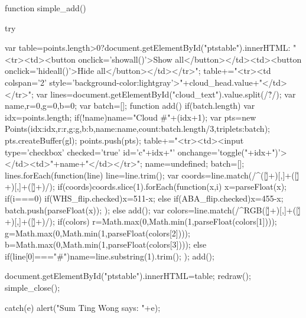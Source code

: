             function simple_add(){
                try{
                    var table=points.length>0?document.getElementById("ptstable").innerHTML:
                            "<tr><td><button onclick='showall()'>Show all</button></td><td><button onclick='hideall()'>Hide all</button></td></tr>";
                    table+="<tr><td colspan='2' style='background-color:lightgray'>"+cloud_head.value+"</td></tr>";
                    var lines=document.getElementById("cloud_text").value.split(/\r?\n/);
                    var name,r=0,g=0,b=0;
                    var batch=[];
                    function add(){
                        if(batch.length){
                            var idx=points.length;
                            if(!name)name="Cloud #"+(idx+1);
                            var pts=new Points({idx:idx,r:r,g:g,b:b,name:name,count:batch.length/3,triplets:batch});
                            pts.createBuffer(gl);
                            points.push(pts);
                            table+="<tr><td><input type='checkbox' checked='true' id='c"+idx+"' onchange='toggle("+idx+")'></td><td>"+name+"</td></tr>";
                            name=undefined;
                            batch=[];
                        }
                    }
                    lines.forEach(function(line){
                        line=line.trim();
                        var coords=line.match(/^([\d\.]+)[\s,]+([\d\.]+)[\s,]+([\d\.]+)/);
                        if(coords)coords.slice(1).forEach(function(x,i){
                            x=parseFloat(x);
                            if(i===0){
                                if(WHS_flip.checked)x=511-x;
                                else if(ABA_flip.checked)x=455-x;
                            }
                            batch.push(parseFloat(x));
                        });
                        else{
                            add();
                            var colors=line.match(/^RGB\s*([\d\.]+)[\s,]+([\d\.]+)[\s,]+([\d\.]+)/);
                            if(colors){
                                r=Math.max(0,Math.min(1,parseFloat(colors[1])));
                                g=Math.max(0,Math.min(1,parseFloat(colors[2])));
                                b=Math.max(0,Math.min(1,parseFloat(colors[3])));
                            }else
                                if(line[0]==="#")name=line.substring(1).trim();
                        }
                    });
                    add();

                    document.getElementById("ptstable").innerHTML=table;
                    redraw();
                    simple_close();
                }catch(e){
                    alert("Sum Ting Wong says: "+e);
                }
            }
